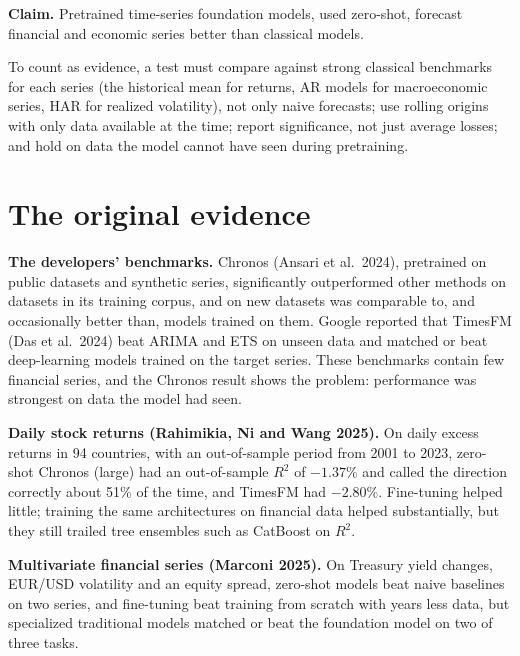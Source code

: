 \begin{callout}
\textbf{Claim.} Pretrained time-series foundation models, used zero-shot, forecast financial and economic series better than classical models.
\end{callout}

To count as evidence, a test must compare against strong classical benchmarks for each series (the historical mean for returns, AR models for macroeconomic series, HAR for realized volatility), not only naive forecasts; use rolling origins with only data available at the time; report significance, not just average losses; and hold on data the model cannot have seen during pretraining.

\section{The original evidence}
\label{sec:21-evidence}

\textbf{The developers' benchmarks.} Chronos (Ansari et al.\ 2024), pretrained on public datasets and synthetic series, significantly outperformed other methods on datasets in its training corpus, and on new datasets was comparable to, and occasionally better than, models trained on them. Google reported that TimesFM (Das et al.\ 2024) beat ARIMA and ETS on unseen data and matched or beat deep-learning models trained on the target series. These benchmarks contain few financial series, and the Chronos result shows the  problem: performance was strongest on data the model had seen.

\textbf{Daily stock returns (Rahimikia, Ni and Wang 2025).} On daily excess returns in 94 countries, with an out-of-sample period from 2001 to 2023, zero-shot Chronos (large) had an out-of-sample $R^2$ of $-1.37\%$ and called the direction correctly about 51\% of the time, and TimesFM had $-2.80\%$. Fine-tuning helped little; training the same architectures on financial data helped substantially, but they still trailed tree ensembles such as CatBoost on $R^2$.

\textbf{Multivariate financial series (Marconi 2025).} On Treasury yield changes, EUR/USD volatility and an equity spread, zero-shot models beat naive baselines on two series, and fine-tuning beat training from scratch with years less data, but specialized traditional models matched or beat the foundation model on two of three tasks.

